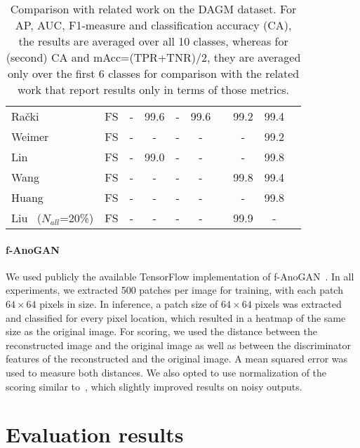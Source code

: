 \begin{table}[]
{\begin{tabular}{@{}lccccccccc@{}}
Rački~\cite{Racki2018}                 & FS                    &  -     & 99.6  & -     & 99.6     & & 99.2    & 99.4    \\
Weimer~\cite{Weimer2016}               & FS                    &  -     & -     & -     & -     & & -     & 99.2    \\
Lin~\cite{Lin2020}                     & FS                    &  -     & 99.0  & -     & -     & & -      & 99.8    \\
Wang~\cite{Wang2018c}                  & FS                    &  -     & -     & -     & -     & & 99.8     & 99.4    \\
Huang~\cite{Huang2020}                 & FS                    &  -     & -     & -     & -     &  & -        & 99.8    \\ 
Liu~\cite{Liu2020a} ($N_{all}$=20\%)                  & FS                    &  -     & -     & -     & -     & & 99.9 & -           \\

\bottomrule
\end{tabular}%
}
\caption{Comparison with related work on the DAGM dataset. For AP, AUC, F1-measure and classification accuracy (CA), the results are averaged over all 10 classes, whereas for (second) CA and mAcc=(TPR+TNR)/2, they are averaged only over the first 6 classes for comparison with the related work that report results only in  terms of those metrics. %
}
\label{tab:DAGMrelatedWork}
\end{table}
\paragraph{f-AnoGAN}
We used publicly the available TensorFlow implementation of f-AnoGAN~\cite{fAnoGAN}. In all experiments, we extracted 500 patches per image for training, with each patch $64\times64$ pixels in size. In inference, a patch size of $64\times64$ pixels was extracted and classified for every pixel location, which resulted in a heatmap of the same size as the original image. For scoring, we used the distance between the reconstructed image and the original image as well as between the discriminator features of the reconstructed and the original image. A mean squared error was used to measure both distances. We also opted to use  normalization of the scoring similar to~\cite{Nguyen2019Scoring}, which slightly improved results on noisy outputs. 

\section{Evaluation results} \label{sec:results}

